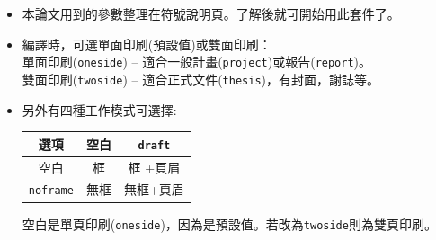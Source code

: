 \begin{itemize}
，
現印於右側以便觀察 (Xe\LaTeX{}則無法呈現)。長書脊時請仿照校名({\tt tabular}技巧)製作兩欄式，只要單獨編譯{\tt bookbone.tex} 即可得。 
\item 本論文用到的參數整理在符號說明頁\framebox{\pageref{symb}}。了解後就可開始用此套件了。
\item 編譯時，可選單面印刷(預設值)或雙面印刷：\\   %
單面印刷({\tt oneside}) -- 適合一般計畫({\tt project})或報告({\tt report})。\\
雙面印刷({\tt twoside}) -- 適合正式文件({\tt thesis})，有封面，謝誌等。
\item 另外有四種工作模式可選擇:\\ 
  

{\color{blue}
\begin{center}
\begin{tabular}{|c|c|c|} \hline 
 選項             &  空白    &  {\tt  draft}      \\ \hline 
 空白             &    框     &    框 +頁眉      \\ \hline
{\tt noframe}  &    無框  &    無框+頁眉   \\ \hline
\end{tabular}
\end{center}
}
空白是單頁印刷({\tt oneside})，因為是預設值。若改為{\tt twoside}則為雙頁印刷。


\end{itemize}
